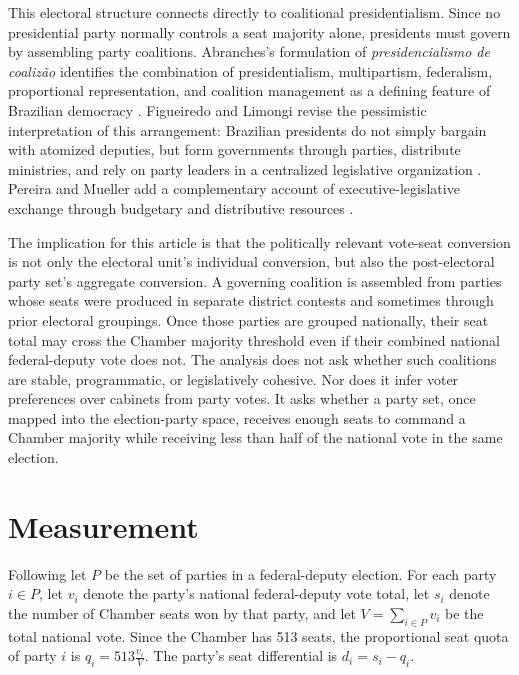 \documentclass[11pt]{article}
\newcommand{\Quota}{q}
\newcommand{\Diff}{d}
\newcommand{\Parties}{P}
\begin{document}
This electoral structure connects directly to coalitional presidentialism. Since no
presidential party normally controls a seat majority alone, presidents must govern
by assembling party coalitions. Abranches's formulation of
\emph{presidencialismo de coalizão} identifies the combination of presidentialism,
multipartism, federalism, proportional representation, and coalition management as
a defining feature of Brazilian democracy \parencite{abranches1988presidencialismo}.
Figueiredo and Limongi revise the pessimistic interpretation of this arrangement:
Brazilian presidents do not simply bargain with atomized deputies, but form
governments through parties, distribute ministries, and rely on party leaders in a
centralized legislative organization \parencite{figueiredo2000presidential}.
Pereira and Mueller add a complementary account of executive-legislative exchange
through budgetary and distributive resources \parencite{pereira2004cost}.

The implication for this article is that the politically relevant vote-seat
conversion is not only the electoral unit's individual conversion, but also the
post-electoral party set's aggregate conversion. A governing coalition is assembled
from parties whose seats were produced in separate district contests and sometimes
through prior electoral groupings. Once those parties are grouped nationally, their
seat total may cross the Chamber majority threshold even if their combined national
federal-deputy vote does not. The analysis does not ask whether such coalitions
are stable, programmatic, or legislatively cohesive. Nor does it infer voter
preferences over cabinets from party votes. It asks whether a party set, once
mapped into the election-party space, receives enough seats to command a Chamber
majority while receiving less than half of the national vote in the same election.

\section{Measurement}
\label{sec:mea}

Following \textcite{miller14_elect_inver_under_propor_repres} let $\Parties$ be the set of parties in a federal-deputy election. For each party
$i \in \Parties$, let $v_i$ denote the party's national federal-deputy vote total,
let $s_i$ denote the number of Chamber seats won by that party, and let $V =
\sum_{i\in\Parties} v_i$ be the total national vote. Since the Chamber has 513
seats, the proportional seat quota of party $i$ is
\(
  \Quota_i = 513\frac{v_i}{V}. \)
The party's seat differential is \(  \Diff_i = s_i - \Quota_i.\)
\end{document}
